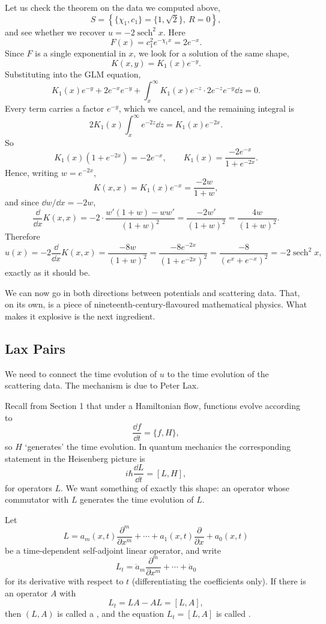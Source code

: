 \documentclass[a4paper]{scrartcl}
\DeclareMathOperator{\sech}{sech}
\begin{document}
\begin{example}
	Let us check the theorem on the data we computed above,
	$$
	S = \left\{\{\chi_1, c_1\} = \{1,\sqrt2\},\ R = 0\right\},
	$$
	and see whether we recover $u = -2\sech^2x$. Here
	$$
	F(x) = c_1^2e^{-\chi_1 x} = 2e^{-x}.
	$$
	Since $F$ is a single exponential in $x$, we look for a solution of the same shape,
	$$
	K(x,y) = K_1(x)e^{-y}.
	$$
	Substituting into the GLM equation,
	$$
	K_1(x)e^{-y} + 2e^{-x}e^{-y} + \int_x^\infty K_1(x)e^{-z}\cdot 2e^{-z}e^{-y}\dd z = 0.
	$$
	Every term carries a factor $e^{-y}$, which we cancel, and the remaining integral is
	$$
	2K_1(x)\int_x^\infty e^{-2z}\dd z = K_1(x)e^{-2x}.
	$$
	So
	$$
	K_1(x)\left(1 + e^{-2x}\right) = -2e^{-x}, \qquad K_1(x) = \frac{-2e^{-x}}{1+e^{-2x}}.
	$$
	Hence, writing $w = e^{-2x}$,
	$$
	K(x,x) = K_1(x)e^{-x} = \frac{-2w}{1+w},
	$$
	and since $\dd w/\dd x = -2w$,
	$$
	\frac{\dd}{\dd x}K(x,x) = -2\cdot\frac{w'(1+w) - ww'}{(1+w)^2} = \frac{-2w'}{(1+w)^2} = \frac{4w}{(1+w)^2}.
	$$
	Therefore
	$$
	u(x) = -2\frac{\dd}{\dd x}K(x,x) = \frac{-8w}{(1+w)^2} = \frac{-8e^{-2x}}{(1+e^{-2x})^2} = \frac{-8}{(e^x + e^{-x})^2} = -2\sech^2x,
	$$
	exactly as it should be.
\end{example}

We can now go in both directions between potentials and scattering data. That, on its own, is a piece of nineteenth-century-flavoured mathematical physics. What makes it explosive is the next ingredient.

\subsection{Lax Pairs}

We need to connect the time evolution of $u$ to the time evolution of the scattering data. The mechanism is due to Peter Lax.

Recall from Section 1 that under a Hamiltonian flow, functions evolve according to
$$
\frac{\dd f}{\dd t} = \{f, H\},
$$
so $H$ `generates' the time evolution. In quantum mechanics the corresponding statement in the Heisenberg picture is
$$
i\hbar\frac{\dd L}{\dd t} = [L, H],
$$
for operators $L$. We want something of exactly this shape: an operator whose commutator with $L$ generates the time evolution of $L$.

\begin{definition}
	Let
	$$
	L = a_m(x,t)\frac{\partial^m}{\partial x^m} + \cdots + a_1(x,t)\frac{\partial}{\partial x} + a_0(x,t)
	$$
	be a time-dependent self-adjoint linear operator, and write
	$$
	L_t = \dot a_m\frac{\partial^m}{\partial x^m}+\cdots+\dot a_0
	$$
	for its derivative with respect to $t$ (differentiating the coefficients only). If there is an operator $A$ with
	$$
	L_t = LA - AL = [L, A],
	$$
	then $(L,A)$ is called a , and the equation $L_t = [L,A]$ is called .
\end{definition}
\end{document}
